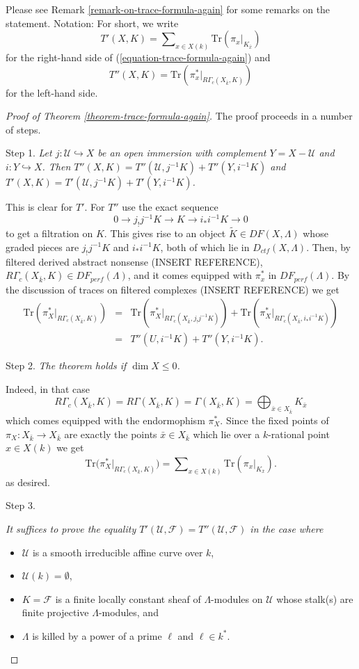 \noindent
Please see Remark \ref{remark-on-trace-formula-again} for some remarks
on the statement. Notation: For short, we write
$$
T'(X, K) =
\sum\nolimits_{x\in X(k)}
\text{Tr}(\pi_x |_{K_{\bar x}})
$$
for the right-hand side of (\ref{equation-trace-formula-again}) and
$$
T''(X, K)
=\text{Tr}(\pi_x^* |_{R\Gamma_c(X_{\bar k}, K)})
$$
for the left-hand side.

\begin{proof}[Proof of Theorem \ref{theorem-trace-formula-again}]
The proof proceeds in a number of steps.

\medskip\noindent
Step 1. {\it Let $j : \mathcal{U}\hookrightarrow X$ be an open immersion with
complement $Y = X - \mathcal{U}$ and $i : Y \hookrightarrow X$. Then
$T''(X, K) = T''(\mathcal{U}, j^{-1} K)+ T''(Y, i^{-1}K)$ and
$T'(X, K) = T'(\mathcal{U}, j^{-1} K)+ T'(Y, i^{-1}K)$.}

\medskip\noindent
This is clear for $T'$. For $T''$ use the exact sequence
$$
0\to j_!j^{-1} K \to K \to i_* i^{-1} K \to 0
$$
to get a filtration on $K$. This gives rise to an object
$\widetilde K \in DF(X, \Lambda)$
whose graded pieces are $j_!j^{-1}K$ and $i_*i^{-1}K$,
both of which lie in $D_{ctf}(X, \Lambda)$. Then, by filtered derived
abstract nonsense (INSERT REFERENCE),
$R\Gamma_c(X_{\bar k}, K)\in DF_{perf}(\Lambda)$,
and it comes equipped with $\pi_x^*$ in
$DF_{perf}(\Lambda)$.
By the discussion of traces on filtered complexes (INSERT REFERENCE) we get
\begin{eqnarray*}
\text{Tr}(\pi_X^* |_{R\Gamma_c(X_{\bar k}, K)})
& = & \text{Tr}(\pi_X^* |_{R\Gamma_c(X_{\bar k}, j_!j^{-1}K)}) +
\text{Tr}(\pi_X^* |_{R\Gamma_c(X_{\bar k}, i_*i^{-1}K)}) \\
& = & T''(U, i^{-1}K) + T''(Y, i^{-1}K).
\end{eqnarray*}

\noindent
Step 2. {\it The theorem holds if $\dim X\leq 0$. }

\medskip\noindent
Indeed, in that case
$$
R\Gamma_c(X_{\bar k}, K) = R\Gamma(X_{\bar k}, K) = \Gamma(X_{\bar k}, K) =
\bigoplus\nolimits_{\bar x \in X_{\bar k}} K_{\bar x}
$$
which comes equipped with the endormophism $\pi_X^*$.
Since the fixed points of $\pi_X : X_{\bar k}\to X_{\bar k}$ are exactly the
points $\bar x \in X_{\bar k}$ which lie over a $k$-rational point $x \in X(k)$
we get
$$
\text{Tr}\big(\pi_X^*|_{R\Gamma_c(X_{\bar k}, K)}\big) =
\sum\nolimits_{x \in X(k)} \text{Tr}(\pi_x|_{K_{\bar x}}).
$$
as desired.

\medskip\noindent
Step 3. {\it It suffices to prove the equality
$T'(\mathcal{U}, \mathcal{F}) = T''(\mathcal{U}, \mathcal{F})$
in the case where
\begin{itemize}
\item $\mathcal{U}$ is a smooth irreducible affine curve over $k$,
\item $\mathcal{U}(k) = \emptyset$,
\item $K=\mathcal{F}$ is a finite locally constant sheaf of $\Lambda$-modules
on $\mathcal{U}$ whose stalk(s) are finite projective $\Lambda$-modules, and
\item $\Lambda$ is killed by a power of a prime $\ell$ and $\ell \in k^*$.
\end{itemize}
}


\end{proof}
